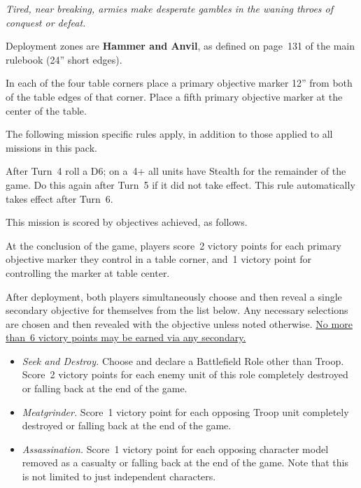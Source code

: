 
\centerline{\emph{Tired, near breaking, armies make desperate gambles
    in the waning throes of conquest or defeat.}}


Deployment zones are \textbf{Hammer and Anvil}, as defined on page~131
of the main rulebook (24'' short edges).

\bigskip%
In each of the four table corners place a primary objective marker
12'' from both of the table edges of that corner.  Place a fifth
primary objective marker at the center of the table.


The following mission specific rules apply, in addition to those
applied to all missions in this pack.

  After Turn~4 roll a D6; on a~4+
all units have Stealth for the remainder of the game.  Do this again
after Turn~5 if it did not take effect.  This rule automatically takes
effect after Turn~6.



This mission is scored by objectives achieved, as follows.

 At the conclusion of the game,
players score~2 victory points for each primary objective marker they
control in a table corner, and~1 victory point for controlling the
marker at table center.




After deployment, both players simultaneously choose and then reveal a
single secondary objective for themselves from the list below.  Any
necessary selections are chosen and then revealed with the objective
unless noted otherwise.  \underline{No more than~6 victory points may
  be earned via any secondary.}

\begin{itemize}
\item \textit{Seek and Destroy.}  Choose and declare a Battlefield
  Role other than Troop.  Score~2 victory points for each enemy unit
  of this role completely destroyed or falling back at the end of the
  game.

\item \textit{Meatgrinder.}  Score~1 victory point for each opposing
  Troop unit completely destroyed or falling back at the end of the
  game.

\item \textit{Assassination.}  Score~1 victory point for each opposing
  character model removed as a casualty or falling back at the end of
  the game.  Note that this is not limited to just independent
  characters.

\end{itemize}

